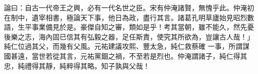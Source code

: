 \begin{pinyinscope}
 論曰：自古一代帝王之興，必有一代名世之臣。宋有仲淹諸賢，無愧乎此。仲淹初在制中，遺宰相書，極論天下事，他日為政，盡行其言。諸葛孔明草廬始見昭烈數語，生平事業備見於是。豪傑自知之審，類如是乎！考其當朝，雖不能久，然先憂後樂之志，海內固已信其有弘毅之器，足任斯責，使究其所欲為，豈讓古人哉！」純仁位過其父，而幾有父風。元祐建議攻熙、豐太急，純仁救蔡確
 一事，所謂謀國甚遠，當世若從其言，元祐黨錮之禍，不至若是烈也。仲淹謂諸子，純仁得其忠，純禮得其靜，純粹得其略。知子孰與父哉！



\end{pinyinscope}